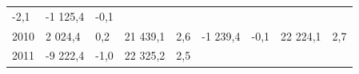 \begin{longtable}[]{@{}lllllllll@{}}
\begin{minipage}[t]{0.06\columnwidth}
-2,1\strut
\end{minipage} & \begin{minipage}[t]{0.09\columnwidth}\raggedright
-1 125,4\strut
\end{minipage} & \begin{minipage}[t]{0.06\columnwidth}\raggedright
-0,1\strut
\end{minipage}\tabularnewline
\begin{minipage}[t]{0.05\columnwidth}\raggedright
2010\strut
\end{minipage} & \begin{minipage}[t]{0.10\columnwidth}\raggedright
2 024,4\strut
\end{minipage} & \begin{minipage}[t]{0.06\columnwidth}\raggedright
0,2\strut
\end{minipage} & \begin{minipage}[t]{0.16\columnwidth}\raggedright
21 439,1\strut
\end{minipage} & \begin{minipage}[t]{0.06\columnwidth}\raggedright
2,6\strut
\end{minipage} & \begin{minipage}[t]{0.12\columnwidth}\raggedright
-1 239,4\strut
\end{minipage} & \begin{minipage}[t]{0.06\columnwidth}\raggedright
-0,1\strut
\end{minipage} & \begin{minipage}[t]{0.09\columnwidth}\raggedright
22 224,1\strut
\end{minipage} & \begin{minipage}[t]{0.06\columnwidth}\raggedright
2,7\strut
\end{minipage}\tabularnewline
\begin{minipage}[t]{0.05\columnwidth}\raggedright
2011\strut
\end{minipage} & \begin{minipage}[t]{0.10\columnwidth}\raggedright
-9 222,4\strut
\end{minipage} & \begin{minipage}[t]{0.06\columnwidth}\raggedright
-1,0\strut
\end{minipage} & \begin{minipage}[t]{0.16\columnwidth}\raggedright
22 325,2\strut
\end{minipage} & \begin{minipage}[t]{0.06\columnwidth}\raggedright
2,5\strut
\end{minipage} & \begin{minipage}[t]{0.12\columnwidth}\raggedright

\end{minipage}
\end{longtable}
